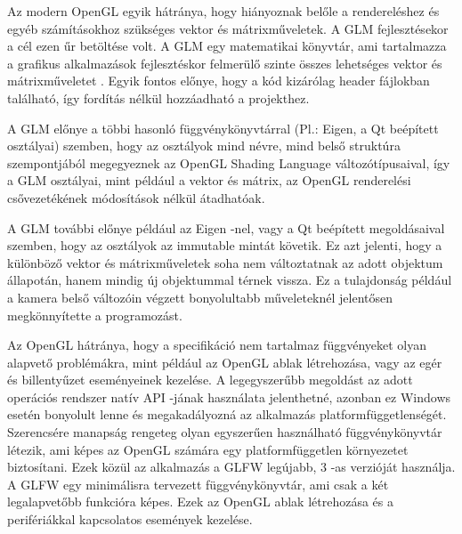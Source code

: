 \vspace{3mm}


\vspace{3mm}

Az modern OpenGL egyik hátránya, 
hogy hiányoznak belőle a rendereléshez 
és egyéb számításokhoz szükséges vektor és mátrixműveletek. 
A GLM fejlesztésekor a cél ezen űr betöltése volt. 
A GLM egy matematikai könyvtár, 
ami tartalmazza a grafikus alkalmazások fejlesztéskor 
felmerülő szinte összes 
lehetséges vektor és mátrixműveletet \cite{glmsite}. 
Egyik fontos előnye, hogy a kód kizárólag header fájlokban található, 
így fordítás nélkül hozzáadható a projekthez.

A GLM előnye a többi hasonló 
függvénykönyvtárral (Pl.: Eigen, a Qt beépített osztályai) szemben, 
hogy az osztályok mind névre, 
mind belső struktúra szempontjából megegyeznek az 
OpenGL Shading Language változótípusaival, 
így a GLM osztályai, mint például a vektor és mátrix,
az OpenGL renderelési csővezetékének módosítások nélkül átadhatóak.

A GLM további előnye például az Eigen -nel, 
vagy a Qt beépített megoldásaival szemben, 
hogy az osztályok az immutable mintát követik. 
Ez azt jelenti, hogy a különböző vektor és mátrixműveletek soha 
nem változtatnak az adott objektum állapotán, 
hanem mindig új objektummal térnek vissza. 
Ez a tulajdonság például a kamera belső változóin 
végzett bonyolultabb műveleteknél jelentősen 
megkönnyítette a programozást.

\vspace{3mm}


\vspace{3mm}

Az OpenGL hátránya, hogy a specifikáció nem tartalmaz függvényeket 
olyan alapvető problémákra, 
mint például az OpenGL ablak létrehozása, 
vagy az egér és billentyűzet eseményeinek kezelése. 
A legegyszerűbb megoldást az adott operációs rendszer 
natív API -jának használata jelenthetné, 
azonban ez Windows esetén bonyolult lenne 
és megakadályozná az alkalmazás platformfüggetlenségét. 
Szerencsére manapság rengeteg olyan egyszerűen 
használható függvénykönyvtár létezik, 
ami képes az OpenGL számára egy platformfüggetlen környezetet biztosítani. 
Ezek közül az alkalmazás a GLFW legújabb, 
3 -as verzióját használja. 
A GLFW egy minimálisra tervezett függvénykönyvtár, 
ami csak a két legalapvetőbb funkcióra képes. 
Ezek az OpenGL ablak létrehozása és 
a perifériákkal kapcsolatos események kezelése.

